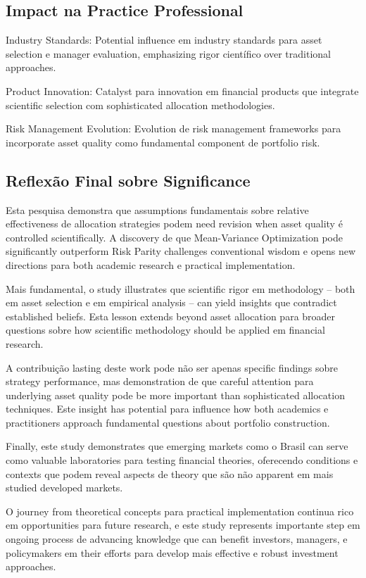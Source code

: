 \subsection{Impact na Practice Professional}

Industry Standards: Potential influence em industry standards para asset selection e manager evaluation, emphasizing rigor científico over traditional approaches.

Product Innovation: Catalyst para innovation em financial products que integrate scientific selection com sophisticated allocation methodologies.

Risk Management Evolution: Evolution de risk management frameworks para incorporate asset quality como fundamental component de portfolio risk.

\subsection{Reflexão Final sobre Significance}

Esta pesquisa demonstra que assumptions fundamentais sobre relative effectiveness de allocation strategies podem need revision when asset quality é controlled scientifically. A discovery de que Mean-Variance Optimization pode significantly outperform Risk Parity challenges conventional wisdom e opens new directions para both academic research e practical implementation.

Mais fundamental, o study illustrates que scientific rigor em methodology – both em asset selection e em empirical analysis – can yield insights que contradict established beliefs. Esta lesson extends beyond asset allocation para broader questions sobre how scientific methodology should be applied em financial research.

A contribuição lasting deste work pode não ser apenas specific findings sobre strategy performance, mas demonstration de que careful attention para underlying asset quality pode be more important than sophisticated allocation techniques. Este insight has potential para influence how both academics e practitioners approach fundamental questions about portfolio construction.

Finally, este study demonstrates que emerging markets como o Brasil can serve como valuable laboratories para testing financial theories, oferecendo conditions e contexts que podem reveal aspects de theory que são não apparent em mais studied developed markets.

O journey from theoretical concepts para practical implementation continua rico em opportunities para future research, e este study represents importante step em ongoing process de advancing knowledge que can benefit investors, managers, e policymakers em their efforts para develop mais effective e robust investment approaches.